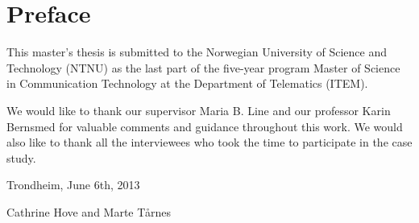 \chapter*{Preface}
This master's thesis is submitted to the Norwegian University of Science and Technology (NTNU) as the last part of the five-year program Master of Science in Communication Technology at the Department of Telematics (ITEM).

We would like to thank our supervisor Maria B. Line and our professor Karin Bernsmed for valuable comments and guidance throughout this work. We would also like to thank all the interviewees who took the time to participate in the case study.

Trondheim, June 6th, 2013

Cathrine Hove and Marte T\aa rnes